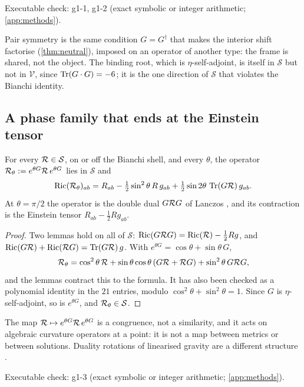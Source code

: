 \noindent Executable check: g1-1, g1-2 (exact symbolic or integer arithmetic; \cref{app:methods}).

Pair symmetry is the same condition $G=G^\dagger$ that makes the interior shift factorise (\cref{thm:neutral}), imposed on an operator of another type: the frame
is shared, not the object. The binding root, which is $\eta$-self-adjoint, is itself in $\mathcal S$ but not in $\mathcal V$, since $\operatorname{Tr}(G\cdot G)=-6$; it is the one
direction of $\mathcal S$ that violates the Bianchi identity.

\subsection{A phase family that ends at the Einstein tensor}

\begin{theorem}
\label{thm:phase}
For every $\mathcal R\in\mathcal S$, on or off the Bianchi shell, and every $\theta$, the operator $\mathcal R_\theta:=e^{\theta G}\mathcal R\,e^{\theta G}$ lies in $\mathcal S$ and
\[
\operatorname{Ric}(\mathcal R_\theta)_{ab}=R_{ab}-\tfrac12\sin^2\theta\,R\,g_{ab}+\tfrac12\sin2\theta\,\operatorname{Tr}(G\mathcal R)\,g_{ab}.
\]
At $\theta=\pi/2$ the operator is the double dual $G\mathcal R G$ of Lanczos \cite{Lanczos38,MTW}, and its contraction is the Einstein tensor $R_{ab}-\tfrac12Rg_{ab}$.
\end{theorem}

\begin{proof}
Two lemmas hold on all of $\mathcal S$: $\operatorname{Ric}(G\mathcal R G)=\operatorname{Ric}(\mathcal R)-\tfrac12Rg$, and $\operatorname{Ric}(G\mathcal R)+\operatorname{Ric}(\mathcal R G)=\operatorname{Tr}(G\mathcal R)\,g$. With $e^{\theta G}=\cos\theta+\sin\theta\,G$,
\[
\mathcal R_\theta=\cos^2\theta\,\mathcal R+\sin\theta\cos\theta\,(G\mathcal R+\mathcal R G)+\sin^2\theta\,G\mathcal R G ,
\]
and the lemmas contract this to the formula. It has also been checked as a polynomial identity in the $21$ entries, modulo $\cos^2\theta+\sin^2\theta=1$. Since $G$ is
$\eta$-self-adjoint, so is $e^{\theta G}$, and $\mathcal R_\theta\in\mathcal S$.
\end{proof}

The map $\mathcal R\mapsto e^{\theta G}\mathcal R\,e^{\theta G}$ is a congruence, not a similarity, and it acts on algebraic curvature operators at a point: it is not a map
between metrics or between solutions. Duality rotations of linearised gravity are a different structure \cite{HenneauxTeitelboim05}.

\noindent Executable check: g1-3 (exact symbolic or integer arithmetic; \cref{app:methods}).

